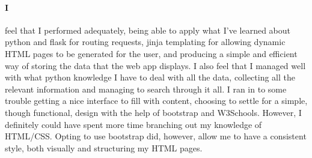 \documentclass[10pt, a4paper]{article}
\begin{document}
    \paragraph{I} feel that I performed adequately, being able to apply what I've learned about python and flask for routing requests, jinja templating for allowing dynamic HTML pages to be generated for the user, and producing a simple and efficient way of storing the data that the web app displays. I also feel that I managed well with what python knowledge I have to deal with all the data, collecting all the relevant information and managing to search through it all. I ran in to some trouble getting a nice interface to fill with content, choosing to settle for a simple, though functional, design with the help of bootstrap\cite{Bootstrap} and W3Schools\cite{W3Schools}. However, I definitely could have spent more time branching out my knowledge of HTML/CSS. Opting to use bootstrap\cite{Bootstrap} did, however, allow me to have a consistent style, both visually and structuring my HTML pages.
    
    
    
    
		
\end{document}
